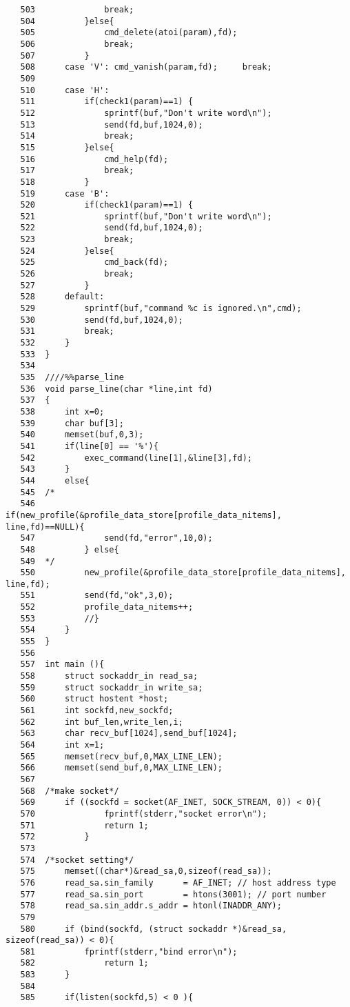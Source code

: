 \documentclass{jarticle}[11pt]
\begin{document}
\begin{verbatim}
   503	            break;
   504	        }else{
   505	            cmd_delete(atoi(param),fd);
   506	            break;
   507	        }
   508	    case 'V': cmd_vanish(param,fd);     break;
   509	        
   510	    case 'H': 
   511	        if(check1(param)==1) {
   512	            sprintf(buf,"Don't write word\n");
   513	            send(fd,buf,1024,0);
   514	            break;
   515	        }else{ 
   516	            cmd_help(fd); 
   517	            break;
   518	        }
   519	    case 'B':
   520	        if(check1(param)==1) {
   521	            sprintf(buf,"Don't write word\n");
   522	            send(fd,buf,1024,0);
   523	            break;
   524	        }else{ 
   525	            cmd_back(fd); 
   526	            break;
   527	        }
   528	    default:
   529	        sprintf(buf,"command %c is ignored.\n",cmd);
   530	        send(fd,buf,1024,0);
   531	        break;
   532	    }
   533	}
   534	
   535	////%%parse_line
   536	void parse_line(char *line,int fd)
   537	{
   538	    int x=0;
   539	    char buf[3];
   540	    memset(buf,0,3);
   541	    if(line[0] == '%'){
   542	        exec_command(line[1],&line[3],fd);
   543	    }
   544	    else{
   545	/*
   546	        if(new_profile(&profile_data_store[profile_data_nitems], line,fd)==NULL){
   547	            send(fd,"error",10,0);
   548	        } else{
   549	*/
   550	        new_profile(&profile_data_store[profile_data_nitems], line,fd);
   551	        send(fd,"ok",3,0);
   552	        profile_data_nitems++;
   553	        //}
   554	    }
   555	}
   556	
   557	int main (){
   558	    struct sockaddr_in read_sa;
   559	    struct sockaddr_in write_sa;
   560	    struct hostent *host;
   561	    int sockfd,new_sockfd;
   562	    int buf_len,write_len,i;
   563	    char recv_buf[1024],send_buf[1024];
   564	    int x=1;
   565	    memset(recv_buf,0,MAX_LINE_LEN);
   566	    memset(send_buf,0,MAX_LINE_LEN);
   567	
   568	/*make socket*/
   569	    if ((sockfd = socket(AF_INET, SOCK_STREAM, 0)) < 0){
   570	            fprintf(stderr,"socket error\n");
   571	            return 1;
   572	        }
   573	
   574	/*socket setting*/
   575	    memset((char*)&read_sa,0,sizeof(read_sa));
   576	    read_sa.sin_family      = AF_INET; // host address type
   577	    read_sa.sin_port        = htons(3001); // port number
   578	    read_sa.sin_addr.s_addr = htonl(INADDR_ANY);
   579	
   580	    if (bind(sockfd, (struct sockaddr *)&read_sa, sizeof(read_sa)) < 0){
   581	        fprintf(stderr,"bind error\n");
   582	            return 1;
   583	    }
   584	    
   585	    if(listen(sockfd,5) < 0 ){

\end{verbatim}
\end{document}
